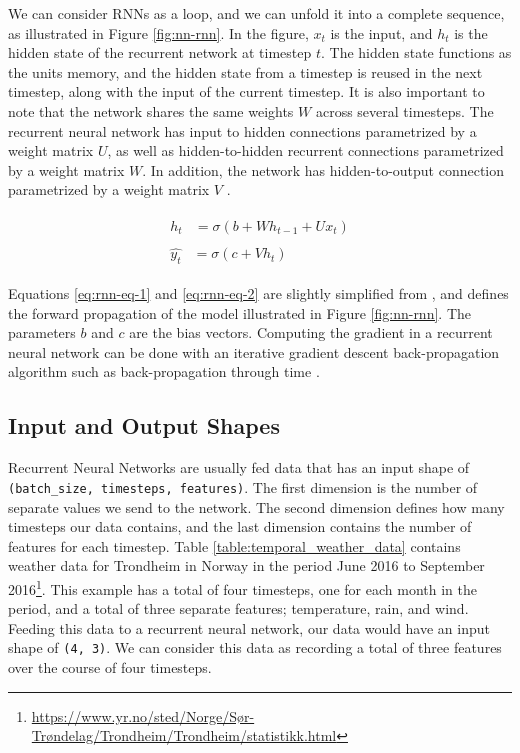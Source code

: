 We can consider RNNs as a loop, and we can unfold it into a complete sequence, as illustrated in Figure \ref{fig:nn-rnn}. In the figure, \(x_{t}\) is the input, and \(h_{t}\) is the hidden state of the recurrent network at timestep \(t\). The hidden state functions as the units memory, and the hidden state from a timestep is reused in the next timestep, along with the input of the current timestep. It is also important to note that the network shares the same weights \(W\) across several timesteps. The recurrent neural network has input to hidden connections parametrized by a weight matrix \(U\), as well as hidden-to-hidden recurrent connections parametrized by a weight matrix \(W\). In addition, the network has hidden-to-output connection parametrized by a weight matrix \(V\) \citep{goodfellow2016deeplearning}.

\begin{align}
    \begin{split}\label{eq:rnn-eq-1}
        h_{t}&=\sigma(b+Wh_{t-1}+Ux_{t})
    \end{split}\\
    \begin{split}\label{eq:rnn-eq-2}
        \hat{y_{t}}&=\sigma(c+Vh_{t})
    \end{split}
\end{align}

Equations \ref{eq:rnn-eq-1} and \ref{eq:rnn-eq-2} are slightly simplified from \citep{goodfellow2016deeplearning}, and defines the forward propagation of the model illustrated in Figure \ref{fig:nn-rnn}. The parameters \(b\) and \(c\) are the bias vectors. Computing the gradient in a recurrent neural network can be done with an iterative gradient descent back-propagation algorithm such as back-propagation through time \citep{werbos1990backpropagation}. 

\subsection{Input and Output Shapes}
\label{sec:input_and_output_shapes}
Recurrent Neural Networks are usually fed data that has an input shape of {\tt (batch\_size, timesteps, features)}. The first dimension is the number of separate values we send to the network. The second dimension defines how many timesteps our data contains, and the last dimension contains the number of features for each timestep. Table \ref{table:temporal_weather_data} contains weather data for Trondheim in Norway in the period June 2016 to September 2016\footnote{\url{https://www.yr.no/sted/Norge/Sør-Trøndelag/Trondheim/Trondheim/statistikk.html}}. This example has a total of four timesteps, one for each month in the period, and a total of three separate features; temperature, rain, and wind. Feeding this data to a recurrent neural network, our data would have an input shape of {\tt (4, 3)}. We can consider this data as recording a total of three features over the course of four timesteps.

